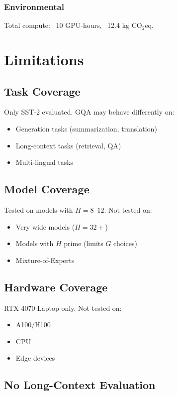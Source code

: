 \subsubsection{Environmental}
Total compute: ~10 GPU-hours, ~12.4 kg CO$_2$eq.


\section{Limitations}

\subsection{Task Coverage}

Only SST-2 evaluated. GQA may behave differently on:
\begin{itemize}
\item Generation tasks (summarization, translation)
\item Long-context tasks (retrieval, QA)
\item Multi-lingual tasks

\end{itemize}
\subsection{Model Coverage}

Tested on models with $H = 8$--$12$. Not tested on:
\begin{itemize}
\item Very wide models ($H = 32+$)
\item Models with $H$ prime (limits $G$ choices)
\item Mixture-of-Experts

\end{itemize}
\subsection{Hardware Coverage}

RTX 4070 Laptop only. Not tested on:
\begin{itemize}
\item A100/H100
\item CPU
\item Edge devices

\end{itemize}
\subsection{No Long-Context Evaluation}

